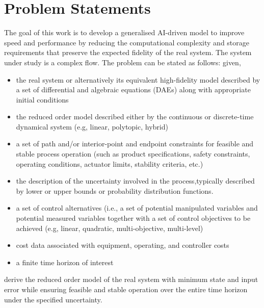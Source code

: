 \documentclass[oneside,11pt,a4paper]{article}
\begin{document}
\section{Problem Statements}
The goal of this work is to develop a generalised AI-driven model to improve speed and performance by reducing the computational complexity and storage requirements that preserve the expected fidelity of the real system. The system under study is a complex flow. The problem can be stated as follows: given,
\begin{itemize}[nosep,topsep=-4mm]
    \item the real system or alternatively its equivalent high-fidelity model described by a set of differential and algebraic equations (DAEs) along with appropriate initial conditions
    \item the reduced order model described either by the continuous or discrete-time dynamical system (e.g, linear, polytopic, hybrid)
    \item a set of path and/or interior-point and endpoint constraints for feasible and stable process operation (such as product specifications, safety constraints, operating conditions, actuator limits, stability criteria, etc.)
    \item the description of the uncertainty involved in the process,typically described by lower or upper bounds or probability distribution functions.
    \item a set of control alternatives (i.e., a set of potential manipulated variables and potential measured variables together with a set of control objectives to be achieved (e.g, linear, quadratic, multi-objective, multi-level)
    \item cost data associated with equipment, operating, and controller costs
    \item a finite time horizon of interest
\end{itemize}
derive the reduced order model of the real system with minimum state and input error while ensuring feasible and stable operation over the entire time horizon under the specified uncertainty.
\end{document}
